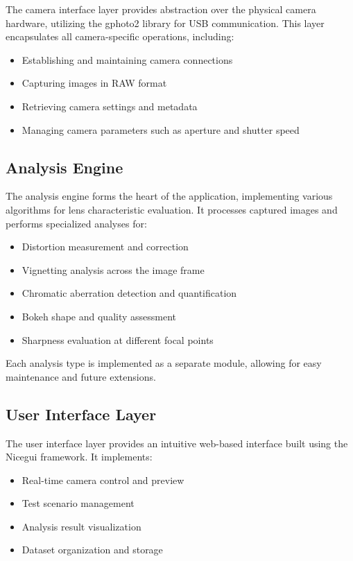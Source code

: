 The camera interface layer provides abstraction over the physical camera hardware, utilizing the gphoto2 library for USB communication. This layer encapsulates all camera-specific operations, including:

\begin{itemize}
    \item Establishing and maintaining camera connections
    \item Capturing images in RAW format
    \item Retrieving camera settings and metadata
    \item Managing camera parameters such as aperture and shutter speed
\end{itemize}

\subsection{Analysis Engine}

The analysis engine forms the heart of the application, implementing various algorithms for lens characteristic evaluation. It processes captured images and performs specialized analyses for:

\begin{itemize}
    \item Distortion measurement and correction
    \item Vignetting analysis across the image frame
    \item Chromatic aberration detection and quantification
    \item Bokeh shape and quality assessment
    \item Sharpness evaluation at different focal points
\end{itemize}

Each analysis type is implemented as a separate module, allowing for easy maintenance and future extensions.

\subsection{User Interface Layer}

The user interface layer provides an intuitive web-based interface built using the Nicegui framework. It implements:

\begin{itemize}
    \item Real-time camera control and preview
    \item Test scenario management
    \item Analysis result visualization
    \item Dataset organization and storage
\end{itemize}

